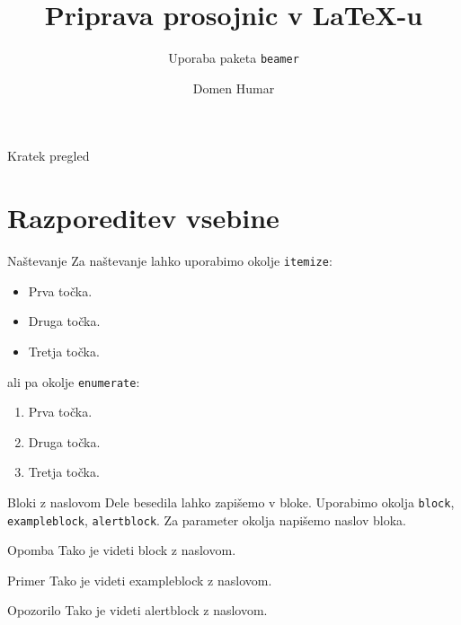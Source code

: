 \documentclass{beamer}
\title{Priprava prosojnic v LaTeX-u}
\subtitle{Uporaba paketa \texttt{beamer}}
\author{Domen Humar}
\institute[FMF]{Fakulteta za matematiko in fiziko}
\date{}
\begin{document}
\maketitle


\begin{frame}{Kratek pregled}
   \tableofcontents[pausesections]
\end{frame}

\section{Razporeditev vsebine}


\begin{frame}{Naštevanje}
   Za naštevanje lahko uporabimo okolje \texttt{itemize}:
      \begin{itemize}
         \item Prva točka.
         \item Druga točka.
         \item Tretja točka.
      \end{itemize}
   ali pa okolje \texttt{enumerate}:
      \begin{enumerate}
         \item Prva točka.
         \item Druga točka.
         \item Tretja točka.
      \end{enumerate}
\end{frame}

  
  \begin{frame}
      Bloki z naslovom
      Dele besedila lahko zapišemo v bloke.
      Uporabimo okolja \texttt{block}, \texttt{exampleblock}, \texttt{alertblock}.
      Za parameter okolja napišemo naslov bloka.
      
      \begin{block}
         {Opomba}
            Tako je videti block z naslovom.
      \end{block}
     
     \begin{exampleblock}
         {Primer}
            Tako je videti exampleblock z naslovom.
     \end{exampleblock}
      
      \begin{alertblock}
         {Opozorilo}
            Tako je videti alertblock z naslovom.
      \end{alertblock}
  \end{frame}
\end{document}
